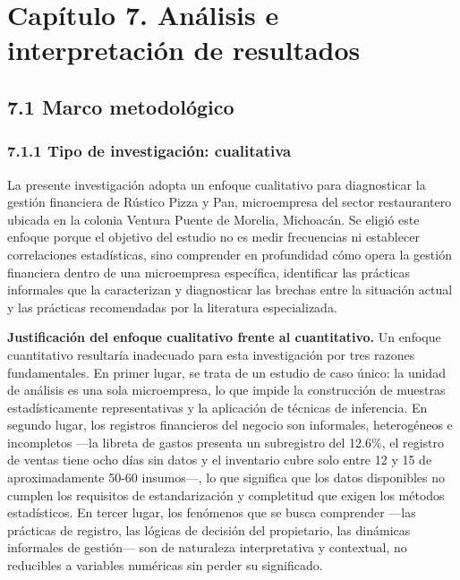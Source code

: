 \documentclass[
  12pt,
  spanish,
]{article}
\author{}
\date{}
\begin{document}
\hypertarget{capuxedtulo-7.-anuxe1lisis-e-interpretaciuxf3n-de-resultados}{%
\section{Capítulo 7. Análisis e interpretación de
resultados}\label{capuxedtulo-7.-anuxe1lisis-e-interpretaciuxf3n-de-resultados}}

\hypertarget{marco-metodoluxf3gico}{%
\subsection{7.1 Marco metodológico}\label{marco-metodoluxf3gico}}

\hypertarget{tipo-de-investigaciuxf3n-cualitativa}{%
\subsubsection{7.1.1 Tipo de investigación:
cualitativa}\label{tipo-de-investigaciuxf3n-cualitativa}}

La presente investigación adopta un enfoque cualitativo para
diagnosticar la gestión financiera de Rústico Pizza y Pan, microempresa
del sector restaurantero ubicada en la colonia Ventura Puente de
Morelia, Michoacán. Se eligió este enfoque porque el objetivo del
estudio no es medir frecuencias ni establecer correlaciones
estadísticas, sino comprender en profundidad cómo opera la gestión
financiera dentro de una microempresa específica, identificar las
prácticas informales que la caracterizan y diagnosticar las brechas
entre la situación actual y las prácticas recomendadas por la literatura
especializada.

\textbf{Justificación del enfoque cualitativo frente al cuantitativo.}
Un enfoque cuantitativo resultaría inadecuado para esta investigación
por tres razones fundamentales. En primer lugar, se trata de un estudio
de caso único: la unidad de análisis es una sola microempresa, lo que
impide la construcción de muestras estadísticamente representativas y la
aplicación de técnicas de inferencia. En segundo lugar, los registros
financieros del negocio son informales, heterogéneos e incompletos ---la
libreta de gastos presenta un subregistro del 12.6\%, el registro de
ventas tiene ocho días sin datos y el inventario cubre solo entre 12 y
15 de aproximadamente 50-60 insumos---, lo que significa que los datos
disponibles no cumplen los requisitos de estandarización y completitud
que exigen los métodos estadísticos. En tercer lugar, los fenómenos que
se busca comprender ---las prácticas de registro, las lógicas de
decisión del propietario, las dinámicas informales de gestión--- son de
naturaleza interpretativa y contextual, no reducibles a variables
numéricas sin perder su significado.
\end{document}
